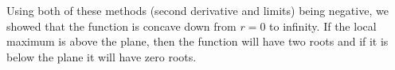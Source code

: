 Using both of these methods (second derivative and limits) being negative, we showed that the function is concave down from $r=0$ to infinity. If the local maximum is above the plane, then the function will have two roots and if it is below the plane it will have zero roots.



\clearpage

